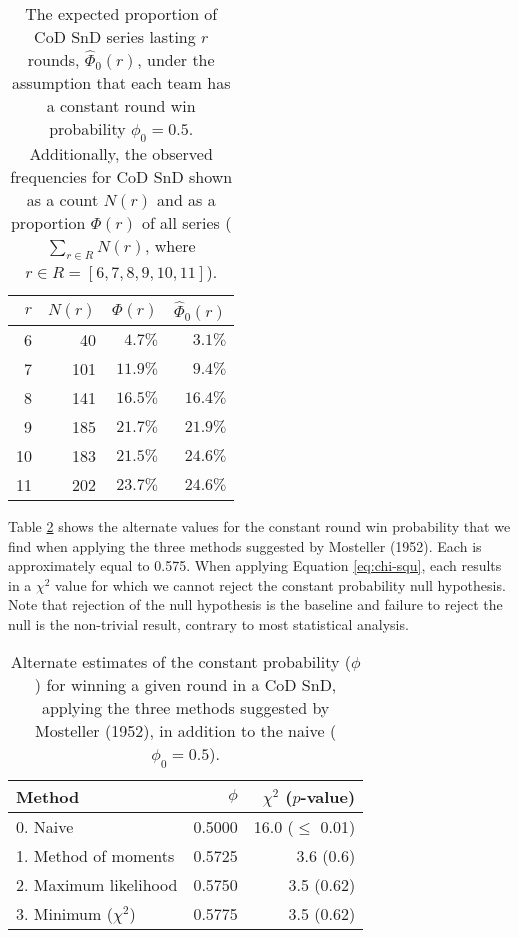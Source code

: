 \documentclass{article}
\begin{document}
\begin{table}
\caption{The expected proportion of CoD SnD series lasting $r$ rounds, $\hat{\Phi}_0(r)$, under the assumption that each team has a constant round win probability $\phi_0 = 0.5$. Additionally, the observed frequencies for CoD SnD shown as a count $N(r)$ and as a proportion $\Phi(r)$ of all series ($\sum_{r \in R} N(r)$, where $r \in R = [6, 7, 8, 9, 10, 11]$).}

\centering
\begin{tabular}{rrrr}
\toprule
$r$ & $N(r)$ & $\Phi(r)$ & $\hat{\Phi}_0(r)$ \\ 
\midrule

6 & 40 & $4.7\%$ & $3.1\%$ \\ 
7 & 101 & $11.9\%$ & $9.4\%$ \\ 
8 & 141 & $16.5\%$ & $16.4\%$ \\ 
9 & 185 & $21.7\%$ & $21.9\%$ \\ 
10 & 183 & $21.5\%$ & $24.6\%$ \\ 
11 & 202 & $23.7\%$ & $24.6\%$ \\ 

\bottomrule
\end{tabular}

\label{tbl:prob-series-lasts-r-rounds}

\end{table}

Table \ref{tbl:mosteller-methods-results} shows the alternate values for
the constant round win probability that we find when applying the three
methods suggested by Mosteller (1952). Each is approximately equal to
0.575. When applying Equation \ref{eq:chi-squ}, each results in a
\(\chi^2\) value for which we cannot reject the constant probability
null hypothesis. Note that rejection of the null hypothesis is the
baseline and failure to reject the null is the non-trivial result,
contrary to most statistical analysis.

\begin{table}

\caption{Alternate estimates of the constant probability ($\phi$) for winning a given round in a CoD SnD, applying the three methods suggested by Mosteller (1952), in addition to the naive ($\phi_0 = 0.5$).}

\centering
\begin{tabular}{lrr}
\toprule
Method & $\phi$ & $\chi^2$ ($p$-value) \\
\midrule

0. Naive & 0.5000 & 16.0 ($\leq$ 0.01) \\
1. Method of moments & 0.5725 & 3.6 (0.6) \\
2. Maximum likelihood & 0.5750 & 3.5 (0.62) \\
3. Minimum ($\chi^2$) & 0.5775 & 3.5 (0.62) \\

\bottomrule
\end{tabular}

\label{tbl:mosteller-methods-results}

\end{table}
\end{document}
